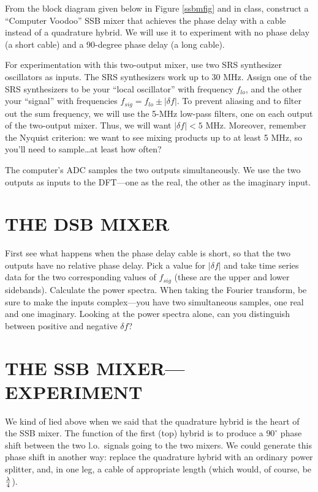 \documentclass[11pt,preprint]{aastex}
\begin{document}
From the block diagram given below in Figure \ref{ssbmfig} and in class,
construct a ``Computer Voodoo'' SSB mixer that achieves the phase delay
with a cable instead of a quadrature hybrid. We will use it to experiment
with no phase delay (a short cable) and a 90-degree phase delay (a long
cable).

For experimentation with this two-output mixer, use two SRS synthesizer
oscillators as inputs.  The SRS synthesizers work up to 30 MHz.  Assign
one of the SRS synthesizers to be your ``local oscillator'' with
frequency $f_{lo}$, and the other your ``signal'' with frequencies $f_{sig}
= f_{lo} \pm |\delta f|$.  To prevent aliasing and to filter out the sum
frequency, we will use the 5-MHz low-pass filters, one on each output of
the two-output mixer. Thus, we will want $|\delta f| < 5$ MHz. Moreover,
remember the Nyquist criterion: we want to see mixing products up to at
least 5 MHz, so you'll need to sample\dots at least how often?

The computer's ADC samples the two outputs simultaneously. We use the
two outputs as inputs to the DFT---one as the real, the other as the
imaginary input.

\section{THE DSB MIXER} \label{dsbmixer}

First see what happens when the phase delay cable is short, so that the two
outputs have no relative phase delay. Pick a value for $|\delta f|$ and
take time series data for the two corresponding values of $f_{sig}$ (these
are the upper and lower sidebands). Calculate the power spectra. When
taking the Fourier transform, be sure to make the inputs complex---you have
two simultaneous samples, one real and one imaginary. Looking at the power
spectra alone, can you distinguish between positive and negative $\delta
f$?


\section{THE SSB MIXER---EXPERIMENT}

We kind of lied above when we said that the quadrature hybrid is the
heart of the SSB mixer. The function of the first (top) hybrid is to
produce a $90^\circ$ phase shift between the two l.o.\ signals going to
the two mixers. We could generate this phase shift in another way:
replace the quadrature hybrid with an ordinary power splitter, and, in
one leg, a cable of appropriate length (which would, of course, be
$\lambda \over 4$).
\end{document}
